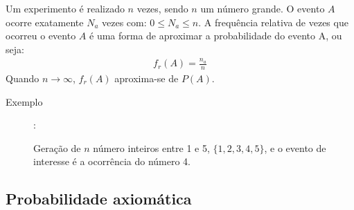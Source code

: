 \documentclass[11pt,a4paper]{book}
\begin{document}
Um experimento é realizado  $n$ vezes, sendo $n$ um número grande. O evento $A$ ocorre exatamente $N_a$ vezes com: $0 \le N_a \le n$. A frequência relativa de vezes que ocorreu o evento $A$ é uma forma de aproximar a probabilidade do evento A, ou seja:
\begin{align}
  f_r (A)= \frac{n_a}{n}
\end{align}
Quando $n \to \infty$, $f_r(A)$ aproxima-se de $P(A)$.
\begin{description}
  \item[Exemplo]: 

 Geração de $n$ número inteiros entre 1 e 5, $\{ 1,2,3,4,5 \}$, e o evento de interesse é a ocorrência do número 4.
\end{description}
\subsection{Probabilidade axiomática}
\end{document}
